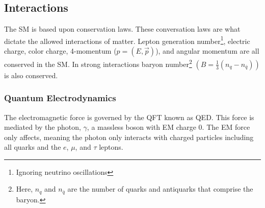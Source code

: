 	\subsection{Interactions}\label{ssec:Interactions}
		 The \gls{SM} is based upon conservation laws. These conversation laws are what dictate the allowed interactions of matter. Lepton generation number\footnote{Ignoring neutrino oscillations}, electric charge, color charge, 4-momentum ($p=(E,\vec{p})$), and angular momentum are all conserved in the \gls{SM}. In strong interactions baryon number\footnote{Here, $n_{q}$ and $n_{\bar{q}}$ are the number of quarks and antiquarks that comprise the baryon.} $(B = \frac{1}{3}(n_{q} - n_{\bar{q}}) )$ is also conserved.

		\subsubsection{Quantum Electrodynamics}\label{sssec:QED}
			The electromagnetic force is governed by the \gls{QFT} known as \acrfull{QED}. This force is mediated by the photon, $\gamma$, a massless boson with \gls{EM} charge 0. The \gls{EM} force only affects, meaning the photon only interacts with charged particles including all quarks and the $e$, $\mu$, and $\tau$ leptons.

